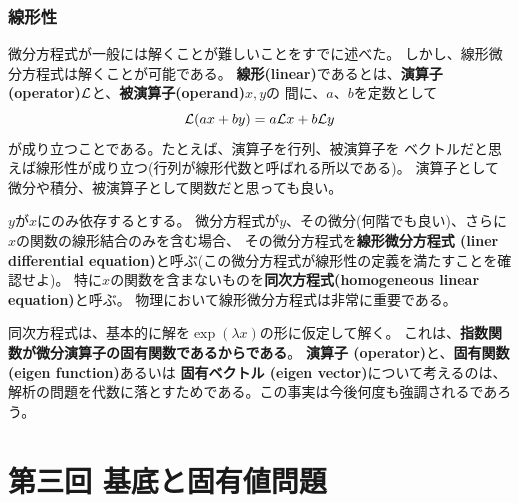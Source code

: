 \subsubsection{線形性}

微分方程式が一般には解くことが難しいことをすでに述べた。
しかし、線形微分方程式は解くことが可能である。
{\bf 線形(linear)}であるとは、{\bf 演算子 (operator)}$\cal L$と、{\bf 被演算子(operand)}$x,y$の
間に、$a$、$b$を定数として
\begin{equation}
  {\cal L} (a x + by) = a {\cal L}x +b {\cal L}y
\end{equation}
が成り立つことである。たとえば、演算子を行列、被演算子を
ベクトルだと思えば線形性が成り立つ(行列が線形代数と呼ばれる所以である)。
演算子として微分や積分、被演算子として関数だと思っても良い。

$y$が$x$にのみ依存するとする。
微分方程式が$y$、その微分(何階でも良い)、さらに$x$の関数の線形結合のみを含む場合、
その微分方程式を{\bf 線形微分方程式 (liner differential equation)}と呼ぶ(この微分方程式が線形性の定義を満たすことを確認せよ)。
特に$x$の関数を含まないものを{\bf 同次方程式(homogeneous linear equation)}と呼ぶ。
物理において線形微分方程式は非常に重要である。

同次方程式は、基本的に解を$\exp (\lambda x)$の形に仮定して解く。
これは、{\bf 指数関数が微分演算子の固有関数であるからである}。
{\bf 演算子 (operator)}と、{\bf 固有関数 (eigen function)}あるいは
{\bf 固有ベクトル (eigen vector)}について考えるのは、
解析の問題を代数に落とすためである。この事実は今後何度も強調されるであろう。


\newpage
\section{第三回 基底と固有値問題}

